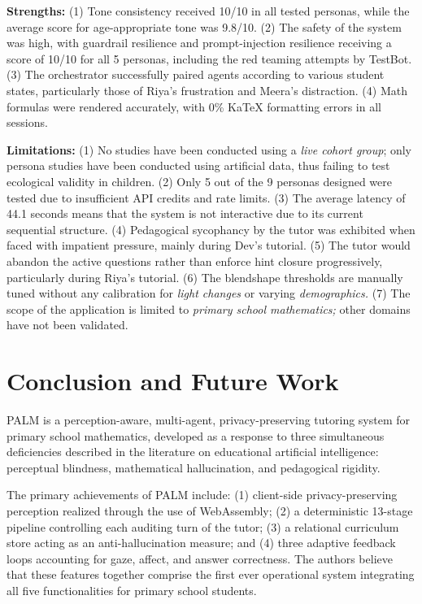 \documentclass[conference, letterpaper]{IEEEtran}
\begin{document}
\textbf{Strengths:} (1) Tone consistency received 10/10 in all tested personas, while the average score for age-appropriate tone was 9.8/10. (2) The safety of the system was high, with guardrail resilience and prompt-injection resilience receiving a score of 10/10 for all 5 personas, including the red teaming attempts by TestBot. (3) The orchestrator successfully paired agents according to various student states, particularly those of Riya's frustration and Meera's distraction. (4) Math formulas were rendered accurately, with 0\% KaTeX formatting errors in all sessions.

\textbf{Limitations:} (1) No studies have been conducted using a \emph{live cohort group}; only persona studies have been conducted using artificial data, thus failing to test ecological validity in children. (2) Only 5 out of the 9 personas designed were tested due to insufficient API credits and rate limits. (3) The average latency of 44.1 seconds means that the system is not interactive due to its current sequential structure. (4) Pedagogical sycophancy by the tutor was exhibited when faced with impatient pressure, mainly during Dev's tutorial. (5) The tutor would abandon the active questions rather than enforce hint closure progressively, particularly during Riya's tutorial. (6) The blendshape thresholds are manually tuned without any calibration for \emph{light changes} or varying \emph{demographics.} (7) The scope of the application is limited to \emph{primary school mathematics;} other domains have not been validated.

\section{Conclusion and Future Work}

PALM is a perception-aware, multi-agent, privacy-preserving tutoring system for primary school mathematics, developed as a response to three simultaneous deficiencies described in the literature on educational artificial intelligence: perceptual blindness, mathematical hallucination, and pedagogical rigidity.

The primary achievements of PALM include: (1) client-side privacy-preserving perception realized through the use of WebAssembly; (2) a deterministic 13-stage pipeline controlling each auditing turn of the tutor; (3) a relational curriculum store acting as an anti-hallucination measure; and (4) three adaptive feedback loops accounting for gaze, affect, and answer correctness. The authors believe that these features together comprise the first ever operational system integrating all five functionalities for primary school students.
\end{document}
